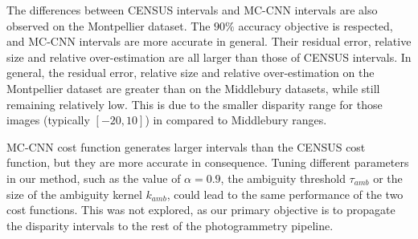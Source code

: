 The differences between CENSUS intervals and MC-CNN intervals are also observed on the Montpellier dataset. The $90\%$ accuracy objective is respected, and MC-CNN intervals are more accurate in general. Their residual error, relative size and relative over-estimation are all larger than those of CENSUS intervals. In general, the residual error, relative size and relative over-estimation on the Montpellier dataset are greater than on the Middlebury datasets, while still remaining relatively low. This is due to the smaller disparity range for those images (typically $[-20, 10]$) in compared to Middlebury ranges. 

\begin{remark}
    MC-CNN cost function generates larger intervals than the CENSUS cost function, but they are more accurate in consequence. Tuning different parameters in our method, such as the value of $\alpha=0.9$, the ambiguity threshold $\tau_{amb}$ or the size of the ambiguity kernel $k_{amb}$, could lead to the same performance of the two cost functions. This was not explored, as our primary objective is to propagate the disparity intervals to the rest of the photogrammetry pipeline.
\end{remark}

